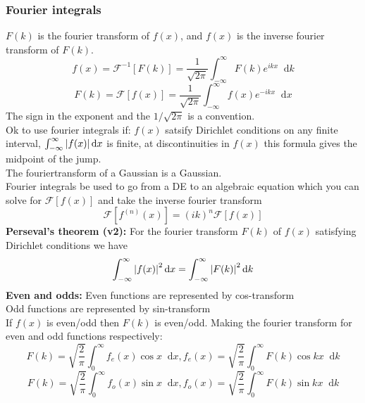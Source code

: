 \documentclass[a4paper, 10pt]{article}
\newcommand*\diff{\mathop{}\!\mathrm{d}}
\begin{document}
\begin{multicols*}{3}
\subsubsection*{\small Fourier integrals}
$F(k)$ is the fourier transform of $f(x)$, and $f(x)$ is the inverse fourier transform of $F(k)$.
$$ f(x) = \mathcal{F}^{-1}\left[ F(k) \right] = \frac{1}{\sqrt{2\pi}} \int_{-\infty}^{\infty} F(k) e^{ikx} \diff k $$
$$ F(k) = \mathcal{F}\left[ f(x) \right] = \frac{1}{\sqrt{2\pi}} \int_{-\infty}^{\infty} f(x) e^{-ik x} \diff x$$
The sign in the exponent and the $1/\sqrt{2\pi}$ is a convention.\\
Ok to use fourier integrals if: $f(x)$ satsify Dirichlet conditions on any finite interval, $\int_{-\infty}^{\infty} \abs{f(x)} \diff x$ is finite, at discontinuities in $f(x)$ this formula gives the midpoint of the jump.\\
The fouriertransform of a Gaussian is a Gaussian.\\
Fourier integrals be used to go from a DE to an algebraic equation which you can solve for $\mathcal{F}\left[ f(x) \right]$ and take the inverse fourier transform
$$ \mathcal{F}\left[ f^{(n)}(x) \right] = (ik)^n\mathcal{F}\left[ f(x) \right]$$
\textbf{Perseval's theorem (v2):}
For the fourier transform $F(k)$ of $f(x)$ satisfying Dirichlet conditions we have
$$\int_{-\infty}^{\infty} \abs{f(x)}^2 \diff x = \int_{-\infty}^{\infty} \abs{F(k)}^2 \diff k $$
\textbf{Even and odds:}
Even functions are represented by cos-transform\\
Odd  functions are represented by sin-transform\\
If $f(x)$ is even/odd then $F(k)$ is even/odd. Making the fourier transform for even and odd functions respectively:
$$F(k) = \sqrt{\frac{2}{\pi}}\int_0^\infty f_e(x) \cos{x}\diff x, f_e(x) = \sqrt{\frac{2}{\pi}} \int_0^\infty F(k)\cos{kx} \diff k$$
$$F(k) = \sqrt{\frac{2}{\pi}}\int_0^\infty f_o(x) \sin{x}\diff x, f_o(x) = \sqrt{\frac{2}{\pi}} \int_0^\infty F(k)\sin{kx} \diff k$$

\begin{mdframed}

\end{mdframed}
\end{multicols*}
\end{document}
